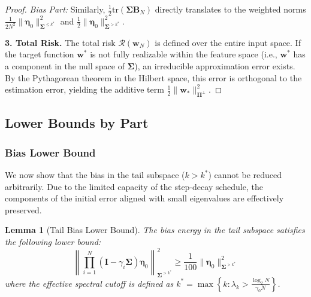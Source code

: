 \documentclass{article}
\theoremstyle{definition}
\theoremstyle{definition}
\theoremstyle{plain}
\theoremstyle{plain}
\theoremstyle{plain}
\newtheorem{lemma}{Lemma}
\theoremstyle{plain}
\theoremstyle{plain}
\newcommand{\bs}[1]{\boldsymbol{\mathbf{#1}}}
\newcommand{\tr}{\mathrm{tr}}
\newcommand{\Sig}{\mathbf{\Sigma}}
\newcommand{\id}{\mathbf{I}}
\newcommand{\nm}[2][]{\left\| #2 \right\|^2_{#1}}
\begin{document}
\begin{proof}
    \textit{Bias Part:}
    Similarly, $\frac{1}{2} \tr(\bs\Sigma \bs B_N)$ directly translates to the weighted norms $\frac{1}{2N^2}\|\bs\eta_0\|^2_{\Sig^{\leq k^*}}$ and $\frac{1}{2}\|\bs\eta_0\|^2_{\Sig^{>k^*}}$.
    
    \textbf{3. Total Risk.}
    The total risk $\mathcal{R}(\bs w_N)$ is defined over the entire input space. If the target function $\bs w^*$ is not fully realizable within the feature space (i.e., $\bs w^*$ has a component in the null space of $\bs \Sigma$), an irreducible approximation error exists. By the Pythagorean theorem in the Hilbert space, this error is orthogonal to the estimation error, yielding the additive term $\frac{1}{2}\|\bs w_*\|_{\bs \Pi^{\perp}}^2$.
\end{proof}

\subsection{Lower Bounds by Part}
\label{subsec:lowerboundsbypart}

\subsubsection{Bias Lower Bound}
\label{subsubsec:biaslowerbound}

We now show that the bias in the tail subspace ($k > k^*$) cannot be reduced arbitrarily. Due to the limited capacity of the step-decay schedule, the components of the initial error aligned with small eigenvalues are effectively preserved.

\begin{lemma}[Tail Bias Lower Bound]
    \label{lemma:bias_lower_bound}
    The bias energy in the tail subspace satisfies the following lower bound:
    \begin{equation}
        \nm[\Sig^{> k^*}]{\prod_{i=1}^N(\id-\gamma_i\bs\Sigma)\bs\eta_0} \geq \frac{1}{100} \|\bs\eta_0\|^2_{\Sig^{> k^*}}
    \end{equation}
    where the effective spectral cutoff is defined as $k^* = \max\left\{k:\lambda_{k}> \frac{\log_2 N}{\gamma_0 N} \right\}$.
\end{lemma}
\end{document}
